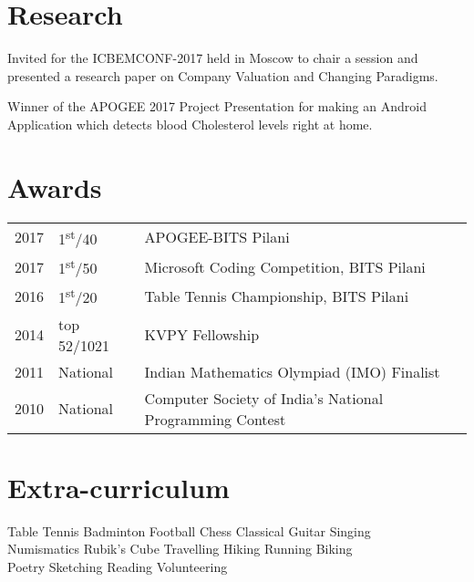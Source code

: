 \documentclass[]{font}
\begin{document}
\begin{minipage}[t]{0.66\textwidth}

\section{Research}
\begin{tightemize}
\item Invited for the ICBEMCONF-2017 held in Moscow to chair a session and presented a research paper on Company Valuation and Changing Paradigms.
\end{tightemize}
\sectionsep

\begin{tightemize}
\item Winner of the APOGEE 2017 Project Presentation for making an Android Application which detects blood Cholesterol levels right at home.
\end{tightemize}
\sectionsep


\section{Awards} 
\begin{tabular}{rll}
2017         & 1\textsuperscript{st}/40       & APOGEE-BITS Pilani\\
2017	     & 1\textsuperscript{st}/50 & Microsoft Coding Competition, BITS Pilani\\
2016         & 1\textsuperscript{st}/20 & Table Tennis Championship, BITS Pilani\\
2014	     & top 52/1021  & KVPY Fellowship\\
2011     & National & Indian Mathematics Olympiad (IMO) Finalist \\
2010     & National & Computer Society of India's National Programming Contest\\
\end{tabular}
\sectionsep


\section{Extra-curriculum}
Table Tennis \textbullet{} Badminton \textbullet{} Football \textbullet{} Chess
\textbullet{} Classical Guitar \textbullet{} Singing \\
Numismatics \textbullet{} Rubik's Cube \textbullet{} Travelling \textbullet{} Hiking \textbullet{} Running \textbullet{} Biking \\
Poetry  \textbullet{} Sketching \textbullet{} Reading \textbullet{} Volunteering
\sectionsep


\end{minipage} 
\end{document}
